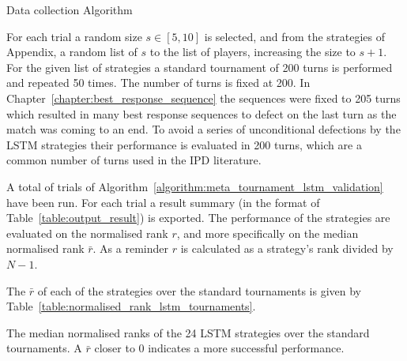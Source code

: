 \begin{algorithm}[!htbp]
    \;
    \caption{Data collection Algorithm}
    \label{algorithm:meta_tournament_lstm_validation}
\end{algorithm}

For each trial a random size \(s \in [5, 10]\) is selected, and from the
\numberofstrategiesbestsequences strategies of Appendix, a random list of \(s\) %
to the list of players, increasing the size to \(s + 1\). For the given list of
strategies a standard tournament of 200 turns is performed and repeated 50
times. The number of turns is fixed at 200. In
Chapter~\ref{chapter:best_response_sequence} the sequences were fixed to 205
turns which resulted in many best response sequences to defect on the last turn
as the match was coming to an end. To avoid a series of 
unconditional defections by the LSTM strategies their performance is evaluated
in  200 turns, which are a common number of turns used in the IPD literature.

A total of \metatournamentslstm trials of
Algorithm~\ref{algorithm:meta_tournament_lstm_validation} have been run. For
each trial a result summary (in the format of Table~\ref{table:output_result})
is exported. The performance of the strategies are evaluated on the normalised
rank \(r\), and more specifically on the median normalised rank \(\bar{r}\). As
a reminder \(r\) is calculated as a strategy's rank divided by \(N-1\).

The \(\bar{r}\) of each of the \lstmstrategies strategies over the \metatournamentslstm
standard tournaments is given by Table~\ref{table:normalised_rank_lstm_tournaments}.

\begin{table}[!htbp]
    \begin{center}
    \resizebox{.9\textwidth}{!}{
        
    }
\end{center}
\caption{The median normalised ranks of the 24 LSTM strategies over the standard
tournaments. A \(\bar{r}\) closer to 0 indicates a more successful performance.}
\label{table:normalised_rank_lstm_tournaments}
\end{table}

